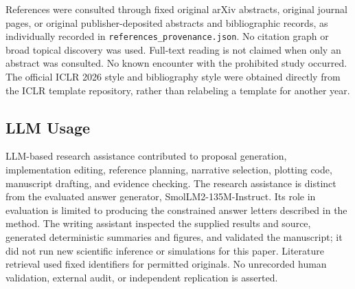 \documentclass{article}
\begin{document}
References were consulted through fixed original arXiv abstracts, original journal pages, or original publisher-deposited abstracts and bibliographic records, as individually recorded in \texttt{references\_provenance.json}. No citation graph or broad topical discovery was used. Full-text reading is not claimed when only an abstract was consulted. No known encounter with the prohibited study occurred. The official ICLR 2026 style and bibliography style were obtained directly from the ICLR template repository, rather than relabeling a template for another year.

\subsection{LLM Usage}
LLM-based research assistance contributed to proposal generation, implementation editing, reference planning, narrative selection, plotting code, manuscript drafting, and evidence checking. The research assistance is distinct from the evaluated answer generator, SmolLM2-135M-Instruct. Its role in evaluation is limited to producing the constrained answer letters described in the method. The writing assistant inspected the supplied results and source, generated deterministic summaries and figures, and validated the manuscript; it did not run new scientific inference or simulations for this paper. Literature retrieval used fixed identifiers for permitted originals. No unrecorded human validation, external audit, or independent replication is asserted.
\end{document}
